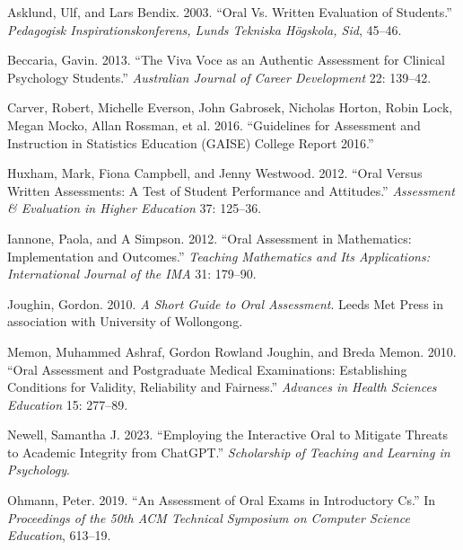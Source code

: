 \documentclass[
  letterpaper,
  DIV=11,
  numbers=noendperiod]{scrartcl}
\newlength{\cslhangindent}
\newlength{\cslentryspacingunit} %
\newenvironment{CSLReferences}[2] %
 {%
  \setlength{\parindent}{0pt}
  \ifodd #1
  \let\oldpar\par
  \def\par{\hangindent=\cslhangindent\oldpar}
  \fi
  \setlength{\parskip}{#2\cslentryspacingunit}
 }%
 {}
\begin{document}
\hypertarget{refs}{}
\begin{CSLReferences}{1}{0}
\leavevmode{}%
Asklund, Ulf, and Lars Bendix. 2003. {``Oral Vs. Written Evaluation of
Students.''} \emph{Pedagogisk Inspirationskonferens, Lunds Tekniska
Högskola, Sid}, 45--46.

\leavevmode{}%
Beccaria, Gavin. 2013. {``The Viva Voce as an Authentic Assessment for
Clinical Psychology Students.''} \emph{Australian Journal of Career
Development} 22: 139--42.

\leavevmode{}%
Carver, Robert, Michelle Everson, John Gabrosek, Nicholas Horton, Robin
Lock, Megan Mocko, Allan Rossman, et al. 2016. {``Guidelines for
Assessment and Instruction in Statistics Education (GAISE) College
Report 2016.''}

\leavevmode{}%
Huxham, Mark, Fiona Campbell, and Jenny Westwood. 2012. {``Oral Versus
Written Assessments: A Test of Student Performance and Attitudes.''}
\emph{Assessment \& Evaluation in Higher Education} 37: 125--36.

\leavevmode{}%
Iannone, Paola, and A Simpson. 2012. {``Oral Assessment in Mathematics:
Implementation and Outcomes.''} \emph{Teaching Mathematics and Its
Applications: International Journal of the IMA} 31: 179--90.

\leavevmode{}%
Joughin, Gordon. 2010. \emph{A Short Guide to Oral Assessment}. Leeds
Met Press in association with University of Wollongong.

\leavevmode{}%
Memon, Muhammed Ashraf, Gordon Rowland Joughin, and Breda Memon. 2010.
{``Oral Assessment and Postgraduate Medical Examinations: Establishing
Conditions for Validity, Reliability and Fairness.''} \emph{Advances in
Health Sciences Education} 15: 277--89.

\leavevmode{}%
Newell, Samantha J. 2023. {``Employing the Interactive Oral to Mitigate
Threats to Academic Integrity from ChatGPT.''} \emph{Scholarship of
Teaching and Learning in Psychology}.

\leavevmode{}%
Ohmann, Peter. 2019. {``An Assessment of Oral Exams in Introductory
Cs.''} In \emph{Proceedings of the 50th ACM Technical Symposium on
Computer Science Education}, 613--19.


\end{CSLReferences}
\end{document}
